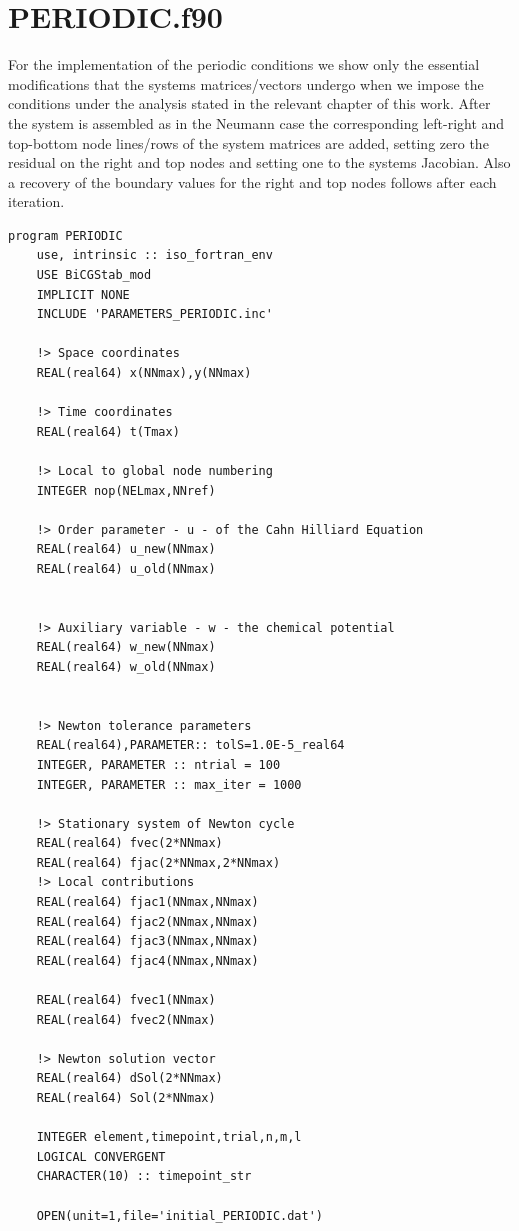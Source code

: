 \documentclass{article}
\begin{document}
\section{PERIODIC.f90}
For the implementation of the periodic conditions we show only the essential modifications that the systems matrices/vectors undergo when we impose the conditions under the analysis stated in the relevant chapter of this work. After the system is assembled as in the Neumann case the corresponding left-right and top-bottom node lines/rows of the system matrices are added, setting zero the residual on the right and top nodes and setting one to the systems Jacobian. Also a recovery of the boundary values for the right and top nodes follows after each iteration.

\begin{verbatim}
program PERIODIC
    use, intrinsic :: iso_fortran_env
    USE BiCGStab_mod
    IMPLICIT NONE
    INCLUDE 'PARAMETERS_PERIODIC.inc'
 
    !> Space coordinates
    REAL(real64) x(NNmax),y(NNmax)
 
    !> Time coordinates
    REAL(real64) t(Tmax)
 
    !> Local to global node numbering
    INTEGER nop(NELmax,NNref)
 
    !> Order parameter - u - of the Cahn Hilliard Equation
    REAL(real64) u_new(NNmax)
    REAL(real64) u_old(NNmax)

 
    !> Auxiliary variable - w - the chemical potential
    REAL(real64) w_new(NNmax)
    REAL(real64) w_old(NNmax)
   
 
    !> Newton tolerance parameters
    REAL(real64),PARAMETER:: tolS=1.0E-5_real64
    INTEGER, PARAMETER :: ntrial = 100
    INTEGER, PARAMETER :: max_iter = 1000
 
    !> Stationary system of Newton cycle
    REAL(real64) fvec(2*NNmax)
    REAL(real64) fjac(2*NNmax,2*NNmax)
    !> Local contributions
    REAL(real64) fjac1(NNmax,NNmax)
    REAL(real64) fjac2(NNmax,NNmax)
    REAL(real64) fjac3(NNmax,NNmax)
    REAL(real64) fjac4(NNmax,NNmax)
    
    REAL(real64) fvec1(NNmax)
    REAL(real64) fvec2(NNmax)
 
    !> Newton solution vector
    REAL(real64) dSol(2*NNmax)
    REAL(real64) Sol(2*NNmax)

    INTEGER element,timepoint,trial,n,m,l
    LOGICAL CONVERGENT
    CHARACTER(10) :: timepoint_str
 
    OPEN(unit=1,file='initial_PERIODIC.dat')


\end{verbatim}
\end{document}
